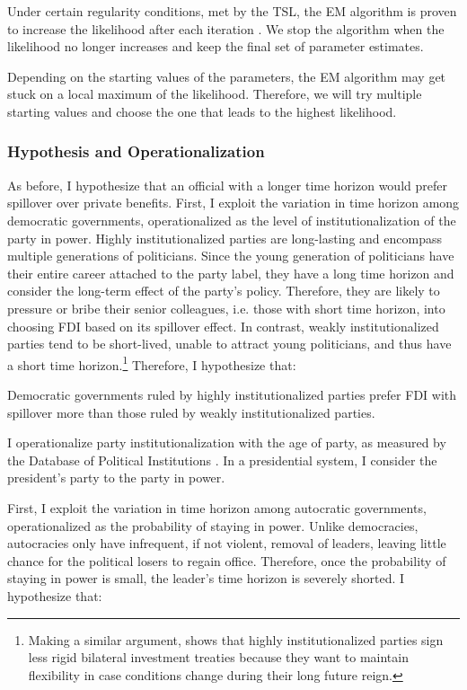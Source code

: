Under certain regularity conditions, met by the TSL, the EM algorithm is proven to increase the likelihood after each iteration \citep[152]{Logan1998}. We stop the algorithm when the likelihood no longer increases and keep the final set of parameter estimates.

Depending on the starting values of the parameters, the EM algorithm may get stuck on a local maximum of the likelihood. Therefore, we will try multiple starting values and choose the one that leads to the highest likelihood.

\subsubsection{Hypothesis and Operationalization}
\label{sec:tsl_hypothesis}

As before, I hypothesize that an official with a longer time horizon would prefer spillover over private benefits. First, I exploit the variation in time horizon among democratic governments, operationalized as the level of institutionalization of the party in power. Highly institutionalized parties are long-lasting and encompass multiple generations of politicians. Since the young generation of politicians have their entire career attached to the party label, they have a long time horizon and consider the long-term effect of the party's policy. Therefore, they are likely to pressure or bribe their senior colleagues, i.e. those with short time horizon, into choosing FDI based on its spillover effect. In contrast, weakly institutionalized parties tend to be short-lived, unable to attract young politicians, and thus have a short time horizon.\footnote{Making a similar argument, \citet{Blake2013} shows that highly institutionalized parties sign less rigid bilateral investment treaties because they want to maintain flexibility in case conditions change during their long future reign.} Therefore, I hypothesize that:

\begin{hyp}
Democratic governments ruled by highly institutionalized parties prefer FDI with spillover more than those ruled by weakly institutionalized parties.
\end{hyp}

I operationalize party institutionalization with the age of party, as measured by the Database of Political Institutions \citep{Keefer2002}. In a presidential system, I consider the president's party to the party in power.

First, I exploit the variation in time horizon among autocratic governments, operationalized as the probability of staying in power. Unlike democracies, autocracies only have infrequent, if not violent, removal of leaders, leaving little chance for the political losers to regain office. Therefore, once the probability of staying in power is small, the leader's time horizon is severely shorted. I hypothesize that:


